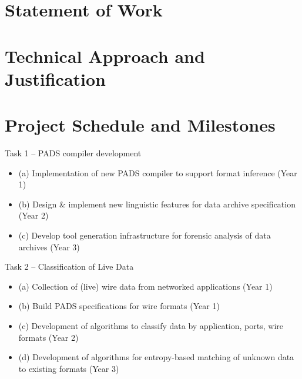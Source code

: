 \documentclass[12pt]{article}
\begin{document}
\section{Statement of Work}



\newpage

\section{Technical Approach and Justification}











%

%

%

%

%



\newpage
\section{Project Schedule and Milestones}

Task 1 -- PADS compiler development
\begin{itemize}
\item (a) Implementation of new PADS compiler to support format inference (Year 1)
\item (b) Design \& implement new linguistic features for data archive specification (Year 2)
\item (c) Develop tool generation infrastructure for forensic analysis of data archives (Year 3)
\end{itemize}

\noindent
Task 2 -- Classification of Live Data
\begin{itemize}
\item (a) Collection of (live) wire data from networked applications (Year 1)
\item (b) Build PADS specifications for wire formats (Year 1)
\item (c) Development of algorithms to classify data by application, ports, wire formats (Year 2)
\item (d) Development of algorithms for entropy-based matching of unknown data to existing formats (Year 3)
\end{itemize}
\end{document}
